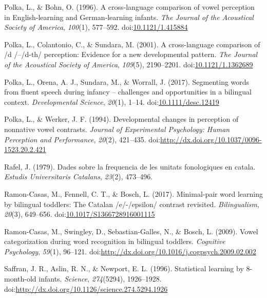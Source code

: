 \documentclass[man,floatsintext]{apa6}
\begin{document}
\leavevmode\hypertarget{ref-polka1996}{}%
Polka, L., \& Bohn, O. (1996). A cross‐language comparison of vowel perception in English‐learning and German‐learning infants. \emph{The Journal of the Acoustical Society of America}, \emph{100}(1), 577--592. doi:\href{https://doi.org/10.1121/1.415884}{10.1121/1.415884}

\leavevmode\hypertarget{ref-polka2001}{}%
Polka, L., Colantonio, C., \& Sundara, M. (2001). A cross-language comparison of /d /--/d-th/ perception: Evidence for a new developmental pattern. \emph{The Journal of the Acoustical Society of America}, \emph{109}(5), 2190--2201. doi:\href{https://doi.org/10.1121/1.1362689}{10.1121/1.1362689}

\leavevmode\hypertarget{ref-polka2017}{}%
Polka, L., Orena, A. J., Sundara, M., \& Worrall, J. (2017). Segmenting words from fluent speech during infancy -- challenges and opportunities in a bilingual context. \emph{Developmental Science}, \emph{20}(1), 1--14. doi:\href{https://doi.org/10.1111/desc.12419}{10.1111/desc.12419}

\leavevmode\hypertarget{ref-polka1994}{}%
Polka, L., \& Werker, J. F. (1994). Developmental changes in perception of nonnative vowel contrasts. \emph{Journal of Experimental Psychology: Human Perception and Performance}, \emph{20}(2), 421--435. doi:\href{https://doi.org/http://dx.doi.org/10.1037/0096-1523.20.2.421}{http://dx.doi.org/10.1037/0096-1523.20.2.421}

\leavevmode\hypertarget{ref-rafel1979}{}%
Rafel, J. (1979). Dades sobre la frequencia de les unitats fonologiques en catala. \emph{Estudis Universitaris Catalans}, \emph{23}(2), 473--496.

\leavevmode\hypertarget{ref-ramoncasas2017}{}%
Ramon-Casas, M., Fennell, C. T., \& Bosch, L. (2017). Minimal-pair word learning by bilingual toddlers: The Catalan /e/-/epsilon/ contrast revisited. \emph{Bilingualism}, \emph{20}(3), 649--656. doi:\href{https://doi.org/10.1017/S1366728916001115}{10.1017/S1366728916001115}

\leavevmode\hypertarget{ref-ramoncasas2009}{}%
Ramon-Casas, M., Swingley, D., Sebastian-Galles, N., \& Bosch, L. (2009). Vowel categorization during word recognition in bilingual toddlers. \emph{Cognitive Psychology}, \emph{59}(1), 96--121. doi:\href{https://doi.org/http://dx.doi.org/10.1016/j.cogpsych.2009.02.002}{http://dx.doi.org/10.1016/j.cogpsych.2009.02.002}

\leavevmode\hypertarget{ref-saffran1996}{}%
Saffran, J. R., Aslin, R. N., \& Newport, E. L. (1996). Statistical learning by 8-month-old infants. \emph{Science}, \emph{274}(5294), 1926--1928. doi:\href{https://doi.org/http://dx.doi.org/10.1126/science.274.5294.1926}{http://dx.doi.org/10.1126/science.274.5294.1926}
\end{document}
